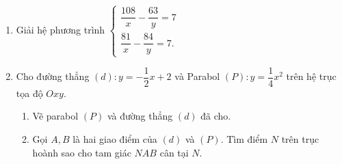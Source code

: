 \begin{ex}%
	\begin{enumerate}[1)]
		\item Giải hệ phương trình $\begin{cases} \dfrac{108}{x} - \dfrac{63}{y} =7 \\ \dfrac{81}{x} - \dfrac{84}{y} = 7. \end{cases}$
		\item Cho đường thẳng $ (d): y = -\dfrac{1}{2}x +2 $ và Parabol $ (P):y = \dfrac{1}{4}x^2 $ trên hệ trục tọa độ $ Oxy. $
		\begin{enumerate}[a/]
			\item Vẽ parabol $ (P) $ và đường thẳng $ (d) $ đã cho.
			\item Gọi $ A,B $ là hai giao điểm của $ (d) $ và $ (P) $. Tìm điểm $ N $ trên trục hoành sao cho tam giác $ NAB $ cân tại $ N.$
		\end{enumerate}
	\end{enumerate}
\end{ex}
